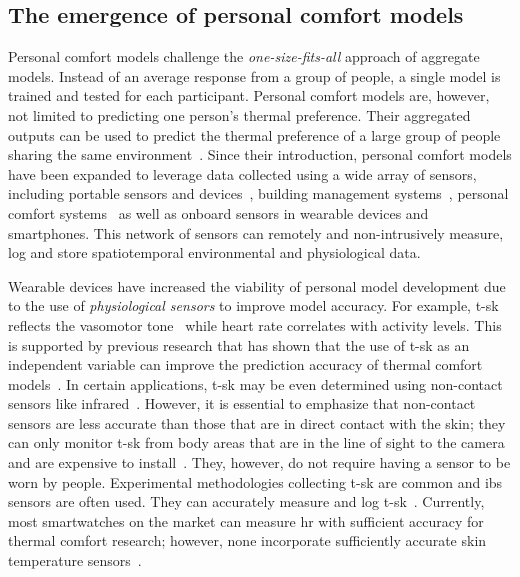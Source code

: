 \subsection{The emergence of personal comfort models}\label{subsec:personal_models}
Personal comfort models challenge the \emph{one-size-fits-all} approach of aggregate models.
Instead of an average response from a group of people, a single model is trained and tested for each participant.
Personal comfort models are, however, not limited to predicting one person's thermal preference.
Their aggregated outputs can be used to predict the thermal preference of a large group of people sharing the same environment~\cite{Kim2018a}.
Since their introduction, personal comfort models have been expanded to leverage data collected using a wide array of sensors, including portable sensors and devices~\cite{Lee2017-tx, Konis2017-eo}, building management systems~\cite{Lee2019-oj, Guenther2019-hb}, personal comfort systems~\cite{Aryal2020-tp} as well as onboard sensors in wearable devices and smartphones.
This network of sensors can remotely and non-intrusively measure, log and store spatiotemporal environmental and physiological data.

Wearable devices have increased the viability of personal model development due to the use of \emph{physiological sensors} to improve model accuracy.
For example, \acf{t-sk} reflects the vasomotor tone~\cite{Romanovsky2018} while heart rate correlates with activity levels.
This is supported by previous research that has shown that the use of \ac{t-sk} as an independent variable can improve the prediction accuracy of thermal comfort models~\cite{Choi2017, Choi2012a, Liu2019a, Ji2017, Xiong2016, Katic2020-pt}.
In certain applications, \ac{t-sk} may be even determined using non-contact sensors like infrared~\cite{Ghahramani2016, Li2019a, Cosma2018a}.
However, it is essential to emphasize that non-contact sensors are less accurate than those that are in direct contact with the skin;
they can only monitor \ac{t-sk} from body areas that are in the line of sight to the camera and are expensive to install~\cite{Xie2020}.
They, however, do not require having a sensor to be worn by people.
Experimental methodologies collecting \ac{t-sk} are common and \glspl{ib} sensors are often used.
They can accurately measure and log \ac{t-sk}~\cite{VanMarkenLichtenbelt2006, Hasselberg2013a, Tartarini2020d}.
Currently, most smartwatches on the market can measure \ac{hr} with sufficient accuracy for thermal comfort research;
however, none incorporate sufficiently accurate skin temperature sensors~\cite{Liu2019a}.

